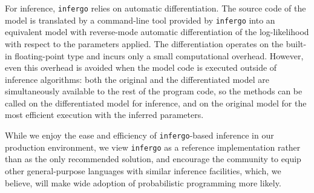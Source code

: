 \documentclass[sigplan,review]{acmart}\settopmatter{printfolios=true,printccs=false,printacmref=false}
\begin{document}
For inference, \texttt{infergo} relies on automatic
differentiation. The source code of the model is
translated by a command-line tool provided by \texttt{infergo}
into an equivalent model with reverse-mode automatic
differentiation of the log-likelihood with respect 
to the parameters applied. The differentiation operates
on the built-in floating-point type and incurs only a small
computational overhead. However, even this overhead is avoided
when the model code is executed outside of inference algorithms:
both the original and the differentiated model are
simultaneously available to the rest of the program code, so
the methods can be called on the differentiated model for
inference, and on the original model for the most efficient
execution with the inferred parameters.

While we enjoy the ease and efficiency of \texttt{infergo}-based
inference in our production environment, we view
\texttt{infergo} as a reference implementation rather than as
the only recommended solution, and encourage the community to
equip other general-purpose languages with similar inference
facilities, which, we believe, will make wide adoption of
probabilistic programming more likely.


\end{document}
